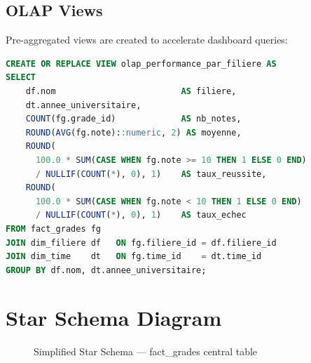 \documentclass[12pt, a4paper]{report}
\begin{document}
\subsection{OLAP Views}

Pre-aggregated views are created to accelerate dashboard queries:

\begin{lstlisting}[language=SQL, style=sqlstyle, caption={OLAP View — Academic Performance by Filière}]
CREATE OR REPLACE VIEW olap_performance_par_filiere AS
SELECT
    df.nom                         AS filiere,
    dt.annee_universitaire,
    COUNT(fg.grade_id)             AS nb_notes,
    ROUND(AVG(fg.note)::numeric, 2) AS moyenne,
    ROUND(
      100.0 * SUM(CASE WHEN fg.note >= 10 THEN 1 ELSE 0 END)
      / NULLIF(COUNT(*), 0), 1)    AS taux_reussite,
    ROUND(
      100.0 * SUM(CASE WHEN fg.note < 10 THEN 1 ELSE 0 END)
      / NULLIF(COUNT(*), 0), 1)    AS taux_echec
FROM fact_grades fg
JOIN dim_filiere df   ON fg.filiere_id = df.filiere_id
JOIN dim_time    dt   ON fg.time_id    = dt.time_id
GROUP BY df.nom, dt.annee_universitaire;
\end{lstlisting}

\section{Star Schema Diagram}

\begin{figure}[H]
\centering
{}
\caption{Simplified Star Schema — fact\_grades central table}
\label{fig:star_schema}
\end{figure}

\end{document}
